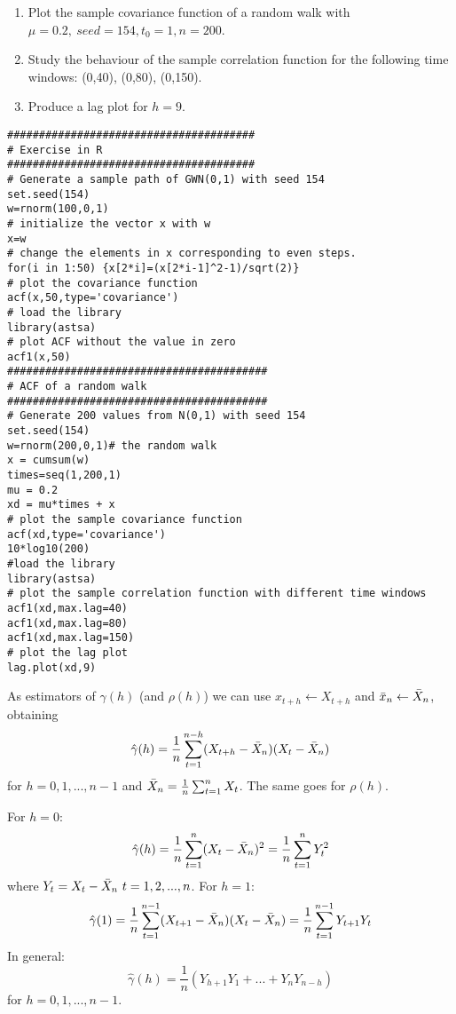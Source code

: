 \begin{example}
    \begin{enumerate}
        \item Plot the sample covariance function of a random walk with $\mu=0.2,\ seed=154, t_0=1, n=200$.
        \item Study the behaviour of the sample correlation function for the following time windows: (0,40), (0,80), (0,150).
        \item Produce a lag plot for $h=9$.
    \end{enumerate}
\begin{verbatim}
#######################################
# Exercise in R
#######################################
# Generate a sample path of GWN(0,1) with seed 154
set.seed(154)
w=rnorm(100,0,1)
# initialize the vector x with w
x=w
# change the elements in x corresponding to even steps.
for(i in 1:50) {x[2*i]=(x[2*i-1]^2-1)/sqrt(2)}
# plot the covariance function
acf(x,50,type='covariance')
# load the library
library(astsa)
# plot ACF without the value in zero
acf1(x,50)
#########################################
# ACF of a random walk
#########################################
# Generate 200 values from N(0,1) with seed 154
set.seed(154)
w=rnorm(200,0,1)# the random walk
x = cumsum(w)
times=seq(1,200,1)
mu = 0.2
xd = mu*times + x
# plot the sample covariance function
acf(xd,type='covariance')
10*log10(200)
#load the library
library(astsa)
# plot the sample correlation function with different time windows
acf1(xd,max.lag=40)
acf1(xd,max.lag=80)
acf1(xd,max.lag=150)
# plot the lag plot
lag.plot(xd,9) 
\end{verbatim}
\end{example}

As estimators of $\gamma(h)$ (and $\rho(h)$) we can use $x_{t+h}\leftarrow X_{t+h}$ and $\bar{x}_n\leftarrow\bar{X}_n$, obtaining
\[
    \hat{\gamma}(h)=\frac{1}{n}\sum_{t=1}^{n-h}(X_{t+h}-\bar{X}_n)(X_t-\bar{X}_n)    
\]
for $h=0,1,...,n-1$ and $\bar{X}_n=\frac{1}{n}\sum_{t=1}^nX_t$. The same goes for $\rho(h)$.

\begin{remark}
    For $h=0$:
    \[
        \hat{\gamma}(h)=\frac{1}{n}\sum_{t=1}^n(X_t-\bar{X}_n)^2=\frac{1}{n}\sum_{t=1}^nY_t^2
    \]
    where $Y_t=X_t-\mean{X}_n\ t=1,2,...,n$.
    For $h=1$:
    \[
        \hat{\gamma}(1)=\frac{1}{n}\sum_{t=1}^{n-1}(X_{t+1}-\bar{X}_n)(X_t-\bar{X}_n)=\frac{1}{n}\sum_{t=1}^{n-1}Y_{t+1}Y_t
    \]
    In general:
    \[
        \hat{\gamma}(h)=\frac{1}{n}\left(Y_{h+1}Y_1+...+Y_nY_{n-h}\right)  
    \]
    for $h=0,1,...,n-1$.
\end{remark}

